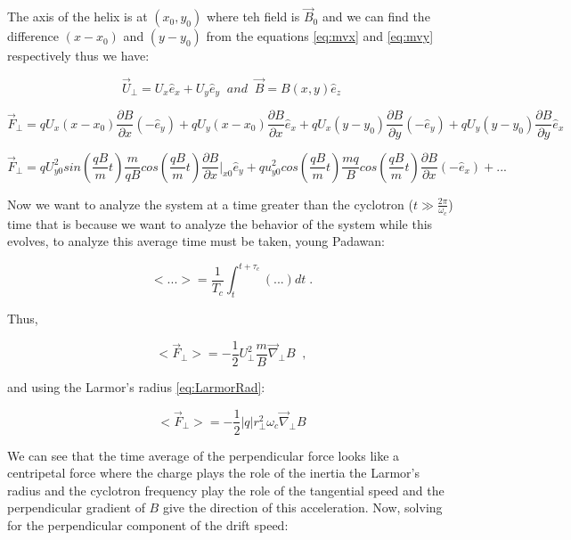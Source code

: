 \documentclass[spanish,notitlepage,letterpaper,11pt]{article} %
\numberwithin{equation}{subsection}
\begin{document}
        The axis of the helix is at $(x_0,y_0)$ where teh field is $\Vec{B}_0$ and we can find the difference $(x-x_0)$ and $(y-y_0)$ from the equations \ref{eq:mvx} and \ref{eq:mvy} respectively thus we have:

        \begin{equation*}
            \Vec{U}_{\perp} = U_x\hat{e}_x + U_y\hat{e}_y \;\;and\;\; \Vec{B} = B(x,y)\hat{e}_z
        \end{equation*}

        \begin{equation*}
            \Vec{F}_{\perp} = qU_x(x-x_0)\frac{\partial B}{\partial x}(-\hat{e}_y) + qU_y(x-x_0)\frac{\partial B}{\partial x}\hat{e}_x + qU_x(y-y_0)\frac{\partial B}{\partial y}(-\hat{e}_y) + qU_y(y-y_0)\frac{\partial B}{\partial y}\hat{e}_x
        \end{equation*}

        \begin{equation*}
            \Vec{F}_{\perp} = qU_{y0}^2sin\left(\frac{qB}{m}t \right)\frac{m}{qB}cos\left(\frac{qB}{m}t \right)\frac{\partial B}{\partial x}|_{x0}\hat{e}_y + qu_{y0}^2cos\left(\frac{qB}{m}t \right)\frac{mq}{B}cos\left(\frac{qB}{m}t \right)\frac{\partial B}{\partial x}(-\hat{e}_x) + ...
        \end{equation*}

        Now we want to analyze the system at a time greater than the cyclotron ($t \gg \frac{2\pi}{\omega_c}$) time that is because we want to analyze the behavior of the system while this evolves, to analyze this average time must be taken, young Padawan:

        \begin{equation}
            <...> = \frac{1}{T_c}\int_t^{t + \tau_c}(...)dt\;.
        \end{equation}

        Thus,

        \begin{equation}
            <\Vec{F}_{\perp}> = -\frac{1}{2}U_{\perp}^2\frac{m}{B}\Vec{\nabla}_{\perp}B \;\;,
        \end{equation}

        and using the Larmor's radius \ref{eq:LarmorRad}:

        \begin{equation}
            <\Vec{F}_{\perp}> = -\frac{1}{2}|q|r_{\perp}^2\omega_c\Vec{\nabla}_{\perp}B
        \end{equation}

        We can see that the time average of the perpendicular force looks like a centripetal force where the charge plays the role of the inertia the Larmor's radius and the cyclotron frequency play the role of the tangential speed and the perpendicular gradient of $B$ give the direction of this acceleration. Now, solving for the perpendicular component of the  drift speed:
        
\end{document}
